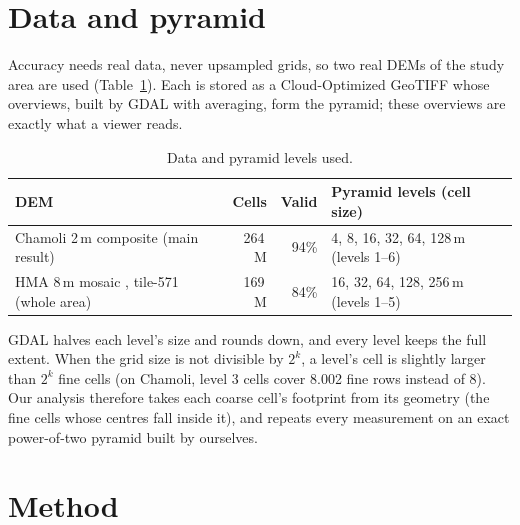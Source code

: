 ﻿\documentclass[11pt,a4paper]{article}
\begin{document}
\section{Data and pyramid}
Accuracy needs real data, never upsampled grids, so two real DEMs of the study area are used
(Table~\ref{tab:data}). Each is stored as a Cloud-Optimized GeoTIFF whose overviews, built by GDAL with averaging,
form the pyramid; these overviews are exactly what a viewer reads.

\begin{table}[!htbp]
\centering\small
\caption{Data and pyramid levels used.}
\label{tab:data}
\begin{tabularx}{\linewidth}{lrrX}
\toprule
DEM & Cells & Valid & Pyramid levels (cell size) \\
\midrule
Chamoli 2\,m composite \cite{chamoli} (main result) & 264\,M & 94\% & 4, 8, 16, 32, 64, 128\,m (levels 1--6) \\
HMA 8\,m mosaic \cite{hma8}, tile-571 (whole area) & 169\,M & 84\% & 16, 32, 64, 128, 256\,m (levels 1--5) \\
\bottomrule
\end{tabularx}
\end{table}

GDAL halves each level's size and rounds down, and every level keeps the full extent. When the grid size is not
divisible by $2^k$, a level's cell is slightly larger than $2^k$ fine cells (on Chamoli, level 3 cells cover 8.002
fine rows instead of 8). Our analysis therefore takes each coarse cell's footprint from its geometry (the fine cells
whose centres fall inside it), and repeats every measurement on an exact power-of-two pyramid built by ourselves.

\section{Method}
\end{document}
